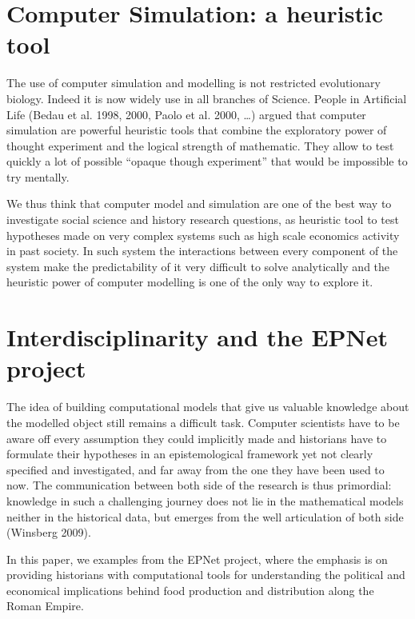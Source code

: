 \documentclass[a4paper]{article}
\begin{document}
\section{Computer Simulation: a heuristic tool}
The use of computer simulation and modelling is not restricted evolutionary biology. Indeed it is now widely use in all branches of Science. People in Artificial Life (Bedau et al. 1998, 2000, Paolo et al. 2000, \ldots) argued that computer simulation are powerful heuristic tools that combine the exploratory power of thought experiment and the logical strength of mathematic. They allow to test quickly a lot of possible ``opaque though experiment'' that would be impossible to try mentally.

We thus think that computer model and simulation are one of the best way to investigate social science and history research questions, as heuristic tool to test hypotheses made on very complex systems such as high scale economics activity in past society. In such system the interactions between every component of the system make the predictability of it very difficult to solve analytically and the heuristic power of computer modelling is one of the only way to explore it.


\section{Interdisciplinarity and the EPNet project}
The idea of building computational models that give us valuable knowledge about the modelled object still remains a difficult task. Computer scientists have to be aware off every assumption they could implicitly made and historians have to formulate their hypotheses in an epistemological framework yet not clearly specified and investigated, and far away from the one they have been used to now. The communication between both side of the research is thus primordial: knowledge in such a challenging journey does not lie in the mathematical models neither in the historical data, but emerges from the well articulation of both side (Winsberg 2009).

In this paper, we examples from the EPNet project, where the emphasis is on providing historians with computational tools for understanding the political and economical implications behind food production and distribution along the Roman Empire.
\end{document}
